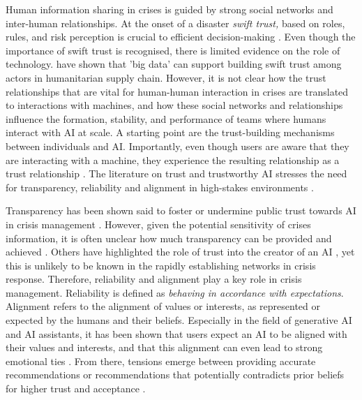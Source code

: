 \documentclass[pdflatex,sn-apa]{sn-jnl}%
\begin{document}
Human information sharing in crises is guided by strong social networks and inter-human relationships. At the onset of a disaster \textit{swift trust,} based on roles, rules, and risk perception is crucial to efficient decision-making \citep{tatham2010application}. Even though the importance of swift trust is recognised, there is limited evidence on the role of technology. \citet{dubey2018big} have shown that 'big data' can support building swift trust among actors in humanitarian supply chain. However, it is not clear how the trust relationships that are vital for human-human interaction in crises are translated to interactions with machines, and how these social networks and relationships influence the formation, stability, and performance of teams where humans interact with AI at scale. A starting point are the trust-building mechanisms between individuals and AI. Importantly, even though users are aware that they are interacting with a machine, they experience the resulting relationship as a trust relationship \citep{manzini2024should}. The literature on trust and trustworthy AI stresses the need for transparency, reliability and alignment in high-stakes environments \citep{lee2004trust, glikson2020human}.

Transparency has been shown said to foster or undermine public trust towards AI in crisis management \citep{steinbrink2024impact, visave2025transparency}. However, given the potential sensitivity of crises information, it is often unclear how much transparency can be provided and achieved \citep{steinbrink2024impact}. Others have highlighted the role of trust into the creator of an AI \citep{saffarizadeh2024relationship}, yet this is unlikely to be known in the rapidly establishing networks in crisis response. Therefore, reliability and alignment play a key role in crisis management. Reliability is defined as \textit{behaving in accordance with expectations}. Alignment refers to the alignment of values or interests, as represented or expected by the humans and their beliefs. Especially in the field of generative AI and AI assistants, it has been shown that users expect an AI to be aligned with their values and interests, and that this alignment can even lead to strong emotional ties \citep{manzini2024should, kaplan2023trust}. From there, tensions emerge between providing accurate recommendations or recommendations that potentially contradicts prior beliefs for higher trust and acceptance \citep{sharma2024generative, ekstrom2022self}.
\end{document}
